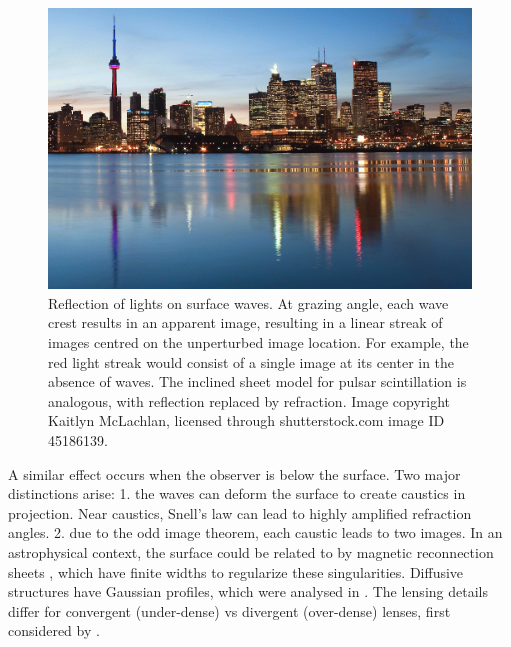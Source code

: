 \documentclass[useAMS,usenatbib]{mn2e}
\begin{document}
\begin{figure}
\centering
\includegraphics[width=1.0\linewidth, angle=0]{toronto-skyline.png}
\caption{Reflection of lights on surface waves.  At grazing angle,
 each wave crest results in an apparent image, resulting in a linear
 streak of images centred on the unperturbed image location.  For
 example, the red light streak would consist of a single image at its
 center in the absence of waves. The inclined sheet model for  pulsar
 scintillation is analogous, with reflection replaced by refraction.
Image copyright Kaitlyn McLachlan,
 licensed through shutterstock.com image ID 45186139.}
\label{fig:water_reflection}
\end{figure}


A similar effect occurs when the
observer is below the surface.  Two major distinctions arise: 1. the
waves can deform the surface to create caustics in projection. Near
caustics, Snell's law can lead to highly amplified refraction
angles\citep{2006ApJ...640L.159G}.  2. due to the odd image theorem, each caustic leads to two
images.  In an astrophysical context, the surface could be related to by magnetic reconnection
sheets \citep{2015MNRAS.450.3201B}, which have finite widths to
regularize these singularities.  Diffusive structures have Gaussian
profiles, which were analysed in \citet{2012MNRAS.421L.132P}.  The
lensing details differ for convergent (under-dense) vs divergent
(over-dense) lenses, first considered by \citet{1998ApJ...496..253C}.
\end{document}
